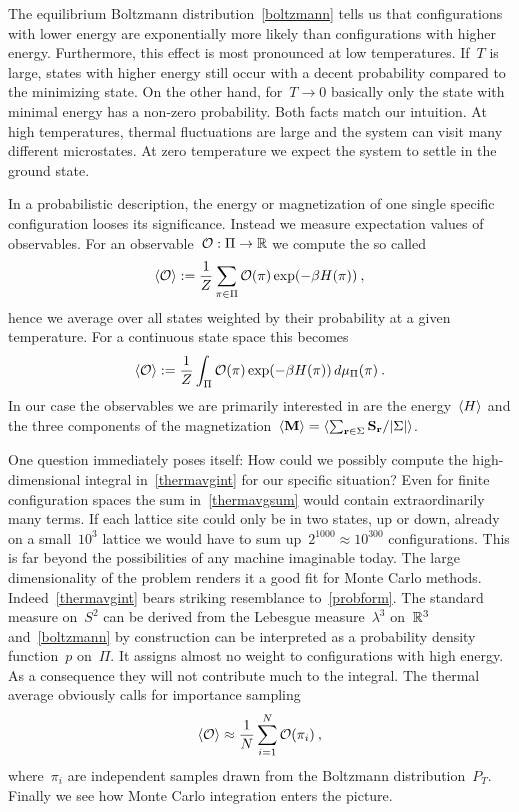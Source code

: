 The equilibrium Boltzmann distribution~\eqref{boltzmann} tells us that
configurations with lower energy are exponentially more likely than
configurations with higher energy. Furthermore, this effect is most pronounced
at low temperatures. If~$T$ is large, states with higher energy still occur with
a decent probability compared to the minimizing state. On the other hand, for~$T
\to 0$ basically only the state with minimal energy has a non-zero probability.
Both facts match our intuition. At high temperatures, thermal fluctuations are
large and the system can visit many different microstates. At zero temperature
we expect the system to settle in the ground state.

In a probabilistic description, the energy or magnetization of one single
specific configuration looses its significance. Instead we measure expectation
values of observables. For an observable~${\mathcal{O}}:{\Pi}\to{\mathbb{R}}$ we compute the so
called 
%
\begin{equation}\label{thermavgsum}
  \langle \mathcal{O} \rangle := \frac{1}{Z} \sum_{\pi \in \Pi} \mathcal{O}(\pi) \exp(- \beta H(\pi))\:,
\end{equation}
%
hence we average over all states weighted by their probability at a given
temperature. For a continuous state space this becomes
%
\begin{equation}\label{thermavgint}
  \langle \mathcal{O} \rangle := \frac{1}{Z} \int_{\Pi} \mathcal{O}(\pi) \exp(- \beta H(\pi))
    \,d\mu_{\Pi}(\pi)\:.
\end{equation}
%
In our case the observables we are primarily interested in are the
energy~$\langle H \rangle$ and the three components of the magnetization~$\avg{\M} =
\avg{\sum_{\r \in \Sigma} \S_{\r} / \abs{\Sigma}}$.

One question immediately poses itself: How could we possibly compute the
high-dimensional integral in~\eqref{thermavgint} for our specific situation?
Even for finite configuration spaces the sum in~\eqref{thermavgsum} would
contain extraordinarily many terms. If each lattice site could only be in two
states, up or down, already on a small~$10^3$ lattice we would have to sum
up~$2^{1000} \approx 10^{300}$ configurations. This is far beyond the
possibilities of any machine imaginable today. The large dimensionality of the
problem renders it a good fit for Monte Carlo methods.
Indeed~\eqref{thermavgint} bears striking resemblance to~\eqref{probform}. The
standard measure on~$S^2$ can be derived from the Lebesgue measure~$\lambda^3$
on~$\mathbb{R}^3$ and~\eqref{boltzmann} by construction can be interpreted as a
probability density function~$p$ on~$\Pi$. It assigns almost no weight to
configurations with high energy. As a consequence they will not contribute much
to the integral. The thermal average obviously calls for importance sampling
%
\begin{equation}\label{thermavgapprox}
  \langle \mathcal{O} \rangle \approx \frac{1}{N} \sum_{i = 1}^N \mathcal{O}(\pi_i)\:,
\end{equation}
%
where~$\pi_i$ are independent samples drawn from the Boltzmann
distribution~$P_T$. Finally we see how Monte Carlo integration enters the
picture.

